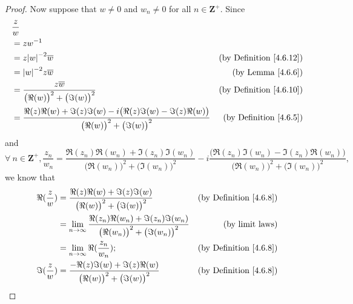 \begin{proof}
    Now suppose that \(w \neq 0\) and \(w_n \neq 0\) for all \(n \in \mathbf{Z}^+\).
    Since
    \begin{align*}
         & \frac{z}{w}                                                                                                                                                       \\
         & = z w^{-1}                                                                                                                                                        \\
         & = z \abs*{w}^{-2} \overline{w}                                                                                              & \text{(by Definition \ref{4.6.12})} \\
         & = \abs*{w}^{-2} z \overline{w}                                                                                              & \text{(by Lemma \ref{4.6.6})}       \\
         & = \frac{z \overline{w}}{\big(\Re(w)\big)^2 + \big(\Im(w)\big)^2}                                                            & \text{(by Definition \ref{4.6.10})} \\
         & = \frac{\Re(z) \Re(w) + \Im(z) \Im(w) - i \big(\Re(z) \Im(w) - \Im(z) \Re(w)\big)}{\big(\Re(w)\big)^2 + \big(\Im(w)\big)^2} & \text{(by Definition \ref{4.6.5})}
    \end{align*}
    and
    \[
        \forall\ n \in \mathbf{Z}^+, \frac{z_n}{w_n} = \frac{\Re(z_n) \Re(w_n) + \Im(z_n) \Im(w_n)}{\big(\Re(w_n)\big)^2 + \big(\Im(w_n)\big)^2} - i \frac{\big(\Re(z_n) \Im(w_n) - \Im(z_n) \Re(w_n)\big)}{\big(\Re(w_n)\big)^2 + \big(\Im(w_n)\big)^2},
    \]
    we know that
    \begin{align*}
        \Re(\frac{z}{w}) & = \frac{\Re(z) \Re(w) + \Im(z) \Im(w)}{\big(\Re(w)\big)^2 + \big(\Im(w)\big)^2}                                   & \text{(by Definition \ref{4.6.8})} \\
                         & = \lim_{n \to \infty} \frac{\Re(z_n) \Re(w_n) + \Im(z_n) \Im(w_n)}{\big(\Re(w_n)\big)^2 + \big(\Im(w_n)\big)^2}   & \text{(by limit laws)}             \\
                         & = \lim_{n \to \infty} \Re(\frac{z_n}{w_n});                                                                       & \text{(by Definition \ref{4.6.8})} \\
        \Im(\frac{z}{w}) & = \frac{- \Re(z) \Im(w) + \Im(z) \Re(w)}{\big(\Re(w)\big)^2 + \big(\Im(w)\big)^2}                                 & \text{(by Definition \ref{4.6.8})} \\

\end{align*}
\end{proof}
